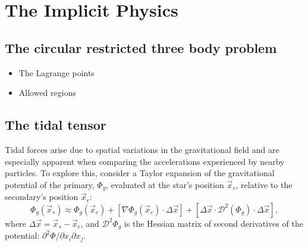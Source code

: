 \section{The Implicit Physics}

    \subsection{The circular restricted three body problem}
        \begin{itemize}
            \item The Lagrange points
            \item Allowed regions 
        \end{itemize}

    \subsection{The tidal tensor}
        Tidal forces arise due to spatial variations in the gravitational field and are especially apparent when comparing the accelerations experienced by nearby particles. To explore this, consider a Taylor expansion of the gravitational potential of the primary, \(\Phi_g\), evaluated at the star's position \(\vec{x}_s\), relative to the secondary's position \(\vec{x}_c\):
        \begin{equation}
            \Phi_g\left(\vec{x}_s\right) \approx \Phi_g\left(\vec{x}_c\right) + \left[\nabla \Phi_g (\vec{x}_c)\cdot \Delta \vec{x}\right] + \left[\Delta \vec{x} \cdot \mathcal{D}^2\left(\Phi_g\right) \cdot \Delta\vec{x}\right],
        \end{equation}
        where \(\Delta \vec{x} = \vec{x}_s - \vec{x}_c\), and \(\mathcal{D}^2 \Phi_g\) is the Hessian matrix of second derivatives of the potential: \(\partial^2 \Phi/\partial x_i \partial x_j\).

